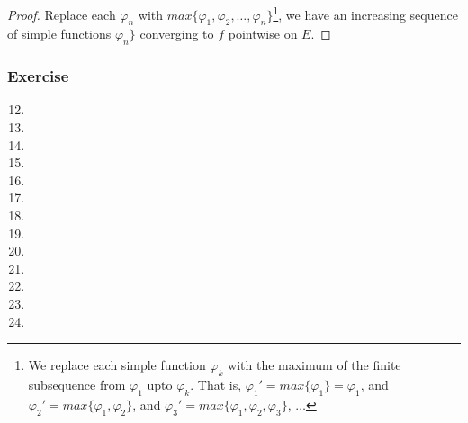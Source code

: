 \begin{proof}
	Replace each $\varphi_n$ with $max\{ \varphi_1,\varphi_2,\dots,\varphi_n\}$\dag\footnote{
		We replace each simple function $\varphi_k$ with the maximum of the finite subsequence from $\varphi_1$ upto $\varphi_k$.
		That is,
		$\varphi_1' = max \{ \varphi_1 \} = \varphi_1$, and
		$\varphi_2' = max \{ \varphi_1,\varphi_2 \}$, and
		$\varphi_3' = max \{ \varphi_1,\varphi_2,\varphi_3 \}$, $\dots$
		},
	we have an increasing sequence of simple functions $\varphi_n \}$ converging to $f$ pointwise on $E$.
\end{proof}
\subsubsection{Exercise}
\begin{enumerate}
	\setcounter{enumi}{11}
	\item
	\item
	\item
	\item
	\item
	\item
	\item
	\item
	\item
	\item
	\item
	\item
	\item
\end{enumerate}
